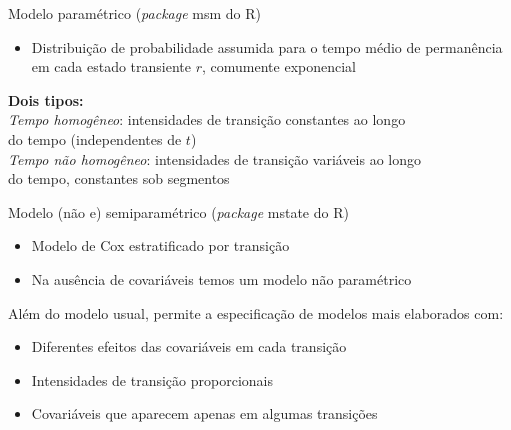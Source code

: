 \begin{frame}

\begin{block}{Modelo paramétrico (\textit{package} msm do R)}
 \begin{itemize}
  \pause \item Distribuição de probabilidade assumida para o tempo médio de
               permanência em cada estado transiente \(r\), comumente
               exponencial
 \end{itemize}
\pause \textbf{Dois tipos:} \\
\vspace{.25cm}
\pause \textit{Tempo homogêneo}:
       intensidades de transição constantes ao longo \\
       \hskip 3.3cm do tempo (independentes de \(t\)) \\
\vspace{.25cm}
\pause \textit{Tempo não homogêneo}:
       intensidades de transição variáveis ao longo \\
       \hskip 3.9cm do tempo, constantes sob segmentos
\end{block}

\end{frame}

\begin{frame}

\begin{block}{Modelo (não e) semiparamétrico (\textit{package} mstate do R)}
 \begin{itemize}
  \pause \item Modelo de Cox estratificado por transição
  \vspace{.15cm}
  \pause \item Na ausência de covariáveis temos um modelo não paramétrico
 \end{itemize}
\vspace{.2cm} \pause Além do modelo usual, permite a especificação de
                     modelos mais elaborados com:
 \begin{itemize}
  \vspace{.2cm}
  \pause \item Diferentes efeitos das covariáveis em cada transição
  \vspace{.15cm}
  \pause \item Intensidades de transição proporcionais
  \vspace{.15cm}
  \pause \item Covariáveis que aparecem apenas em algumas transições
 \end{itemize}
\end{block}

\end{frame}

